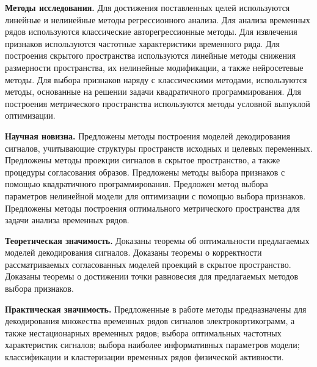 \documentclass[11pt, a5paper]{dissert}
\begin{document}
\vspace{0.5cm}
\textbf{Методы исследования.}
Для достижения поставленных целей используются линейные и нелинейные методы регрессионного анализа.
Для анализа временных рядов используются классические авторегрессионные методы.
Для извлечения признаков используются частотные характеристики временного ряда.
Для построения скрытого пространства используются линейные методы снижения размерности пространства, их нелинейные модификации, а также нейросетевые методы.
Для выбора признаков наряду с классическими методами, используются методы, основанные на решении задачи квадратичного программирования.
Для построения метрического пространства используются методы условной выпуклой оптимизации.

\vspace{0.5cm}
\textbf{Научная новизна.}
Предложены методы построения моделей декодирования сигналов, учитывающие структуры пространств исходных и целевых переменных.
Предложены методы проекции сигналов в скрытое пространство, а также процедуры согласования образов.
Предложены методы выбора признаков с помощью квадратичного программирования.
Предложен метод выбора параметров нелинейной модели для оптимизации с помощью выбора признаков.
Предложены методы построения оптимального метрического пространства для задачи анализа временных рядов.

\vspace{0.5cm}
\textbf{Теоретическая значимость.}
Доказаны теоремы об оптимальности предлагаемых моделей декодирования сигналов.
Доказаны теоремы о корректности рассматриваемых согласованных моделей проекций в скрытое пространство.
Доказаны теоремы о достижении точки равновесия для предлагаемых методов выбора признаков. 

\vspace{0.5cm}
\textbf{Практическая значимость.}
Предложенные в работе методы предназначены для декодирования множества временных рядов сигналов электрокортикограмм, а также нестационарных временных рядов; выбора оптимальных частотных характеристик сигналов; выбора наиболее информативных параметров модели; классификации и кластеризации временных рядов физической активности.
\end{document}
